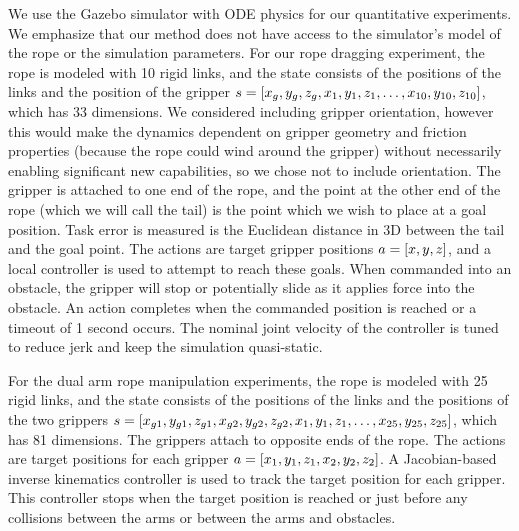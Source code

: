 We use the Gazebo simulator with ODE physics \cite{Gazebo,ODE} for our quantitative experiments. We emphasize that our method does not have access to the simulator's model of the rope or the simulation parameters. For our rope dragging experiment, the rope is modeled with 10 rigid links, and the state consists of the positions of the links and the position of the gripper $s=[x_g,y_g,z_g,x_1,y_1,z_1,\dots,x_{10},y_{10},z_{10}]$, which has 33 dimensions.
We considered including gripper orientation, however this would make the dynamics dependent on gripper geometry and friction properties (because the rope could wind around the gripper) without necessarily enabling significant new capabilities, so we chose not to include orientation. The gripper is attached to one end of the rope, and the point at the other end of the rope (which we will call the tail) is the point which we wish to place at a goal position. Task error is measured is the Euclidean distance in 3D between the tail and the goal point. The actions are target gripper positions $a = [x,y,z]$, and a local controller is used to attempt to reach these goals. When commanded into an obstacle, the gripper will stop or potentially slide as it applies force into the obstacle. An action completes when the commanded position is reached or a timeout of 1 second occurs. The nominal joint velocity of the controller is tuned to reduce jerk and keep the simulation quasi-static.

For the dual arm rope manipulation experiments, the rope is modeled with 25 rigid links, and the state consists of the positions of the links and the positions of the two grippers $s=[x_{g1},y_{g1},z_{g1},x_{g2},y_{g2},z_{g2},x_1,y_1,z_1,\dots,x_{25},y_{25},z_{25}]$, which has 81 dimensions.
The grippers attach to opposite ends of the rope. The actions are target positions for each gripper $a = [x_1,y_1,z_1,x_2,y_2,z_2]$. A Jacobian-based inverse kinematics controller is used to track the target position for each gripper. This controller stops when the target position is reached or just before any collisions between the arms or between the arms and obstacles.